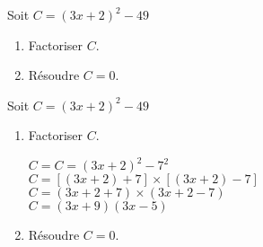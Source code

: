 \begin{exercice*}
    Soit $C=(3x+2)^2 - 49$
    \begin{enumerate}
        \item Factoriser $C$.
        \item Résoudre $C=0$.
    \end{enumerate}
\end{exercice*}
\begin{corrige}
    Soit $C=(3x+2)^2 - 49$
    
    \begin{enumerate}
        \item Factoriser $C$.
        
        $C=C=(3x+2)^2 - 7^2$\\
        $C=[(3x+2)+7]\times[(3x+2)-7]$\\
        $C=(3x+2+7)\times(3x+2-7)$\\
        $C=(3x+9)(3x-5)$
        \item Résoudre $C=0$.
        
    \end{enumerate}
\end{corrige}